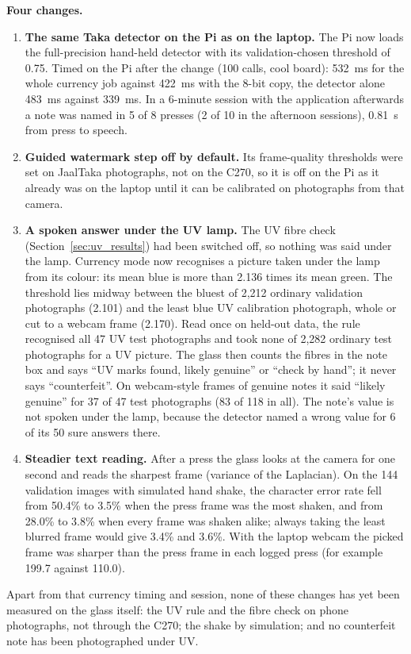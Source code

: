 \textbf{Four changes.}
\begin{enumerate}[noitemsep]
    \item \textbf{The same Taka detector on the Pi as on the laptop.} The Pi now loads the full-precision hand-held detector with its validation-chosen threshold of 0.75. Timed on the Pi after the change (100 calls, cool board): 532~ms for the whole currency job against 422~ms with the 8-bit copy, the detector alone 483~ms against 339~ms. In a 6-minute session with the application afterwards a note was named in 5 of 8 presses (2 of 10 in the afternoon sessions), 0.81~s from press to speech.
    \item \textbf{Guided watermark step off by default.} Its frame-quality thresholds were set on JaalTaka photographs, not on the C270, so it is off on the Pi as it already was on the laptop until it can be calibrated on photographs from that camera.
    \item \textbf{A spoken answer under the UV lamp.} The UV fibre check (Section~\ref{sec:uv_results}) had been switched off, so nothing was said under the lamp. Currency mode now recognises a picture taken under the lamp from its colour: its mean blue is more than 2.136 times its mean green. The threshold lies midway between the bluest of 2,212 ordinary validation photographs (2.101) and the least blue UV calibration photograph, whole or cut to a webcam frame (2.170). Read once on held-out data, the rule recognised all 47 UV test photographs and took none of 2,282 ordinary test photographs for a UV picture. The glass then counts the fibres in the note box and says ``UV marks found, likely genuine'' or ``check by hand''; it never says ``counterfeit''. On webcam-style frames of genuine notes it said ``likely genuine'' for 37 of 47 test photographs (83 of 118 in all). The note's value is not spoken under the lamp, because the detector named a wrong value for 6 of its 50 sure answers there.
    \item \textbf{Steadier text reading.} After a press the glass looks at the camera for one second and reads the sharpest frame (variance of the Laplacian). On the 144 validation images with simulated hand shake, the character error rate fell from 50.4\% to 3.5\% when the press frame was the most shaken, and from 28.0\% to 3.8\% when every frame was shaken alike; always taking the least blurred frame would give 3.4\% and 3.6\%. With the laptop webcam the picked frame was sharper than the press frame in each logged press (for example 199.7 against 110.0).
\end{enumerate}
Apart from that currency timing and session, none of these changes has yet been measured on the glass itself: the UV rule and the fibre check on phone photographs, not through the C270; the shake by simulation; and no counterfeit note has been photographed under UV.

